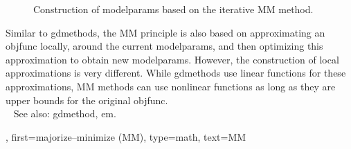 {{\begin{figure}[H]
		\caption{Construction of \glspl{modelparam} based on the iterative MM method.}
			\label{fig:majmin_dict}
		\end{figure}
		Similar to \glspl{gdmethod}, the MM principle is also based on approximating an 
		\gls{objfunc} locally, around the current \glspl{modelparam}, and then optimizing 
		this approximation to obtain new \glspl{modelparam}. However, the construction 
		of local approximations is very different. While \glspl{gdmethod} use linear \glspl{function} 
		for these approximations, MM methods can use nonlinear \glspl{function} as long as 
		they are upper bounds for the original \gls{objfunc}. 
			 \\ 
		See also: \gls{gdmethod}, \gls{em}.},
	first={majorize–minimize (MM)},
	type=math, 
	text={MM}
}


